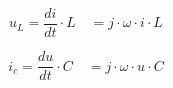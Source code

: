 \vspace{1cm}
\begin{Large}

\begin{minipage}{0.49\textwidth}

\[\boxed{
	u_L=\frac{di}{dt}\cdot L \quad = j\cdot\omega \cdot i\cdot L
}\]
\end{minipage}
\begin{minipage}{0.49\textwidth}
\[\boxed{
	i_c=\frac{du}{dt}\cdot C\quad = j\cdot\omega \cdot u\cdot C
}\]
\end{minipage}

\end{Large}